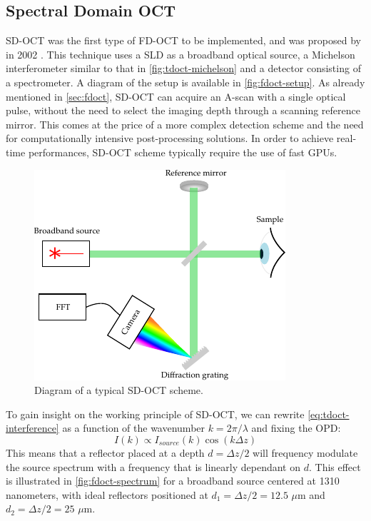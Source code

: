 \subsection{Spectral Domain OCT}
\ac{SD-OCT} was the first type of \ac{FD-OCT} to be implemented, and was proposed by \citeauthor{Wojtkowski2002} in 2002 \cite{Wojtkowski2002}. This technique uses a \ac{SLD} as a broadband optical source, a Michelson interferometer similar to that in \autoref{fig:tdoct-michelson} and a detector consisting of a spectrometer. A diagram of the setup is available in \autoref{fig:fdoct-setup}. As already mentioned in \autoref{sec:fdoct}, \ac{SD-OCT} can acquire an A-scan with a single optical pulse, without the need to select the imaging depth through a scanning reference mirror. This comes at the price of a more complex detection scheme and the need for computationally intensive post-processing solutions. In order to achieve real-time performances, \ac{SD-OCT} scheme typically require the use of fast \acp{GPU}. 

\begin{figure}[hbt]
	\myfloatalign
	\includegraphics[width=0.75\linewidth]{gfx/ch2/fdoct-setup}
	\caption{Diagram of a typical \ac{SD-OCT} scheme.}\label{fig:fdoct-setup}
\end{figure}


To gain insight on the working principle of \ac{SD-OCT}, we can rewrite \autoref{eq:tdoct-interference} as a function of the wavenumber $k = 2\pi/\lambda$ and fixing the \ac{OPD}:
\begin{equation}
	I(k) \propto I_{source}(k)\cos\left(k \Delta z\right)
\end{equation}
This means that a reflector placed at a depth $d = \Delta z/2$ will frequency modulate the source spectrum with a frequency that is linearly dependant on $d$. This effect is illustrated in \autoref{fig:fdoct-spectrum} for a broadband source centered at 1310 nanometers, with ideal reflectors positioned at $d_1 = \Delta z/2 = 12.5$ $\mu$m and $d_2 = \Delta z/2 = 25$ $\mu$m. 

